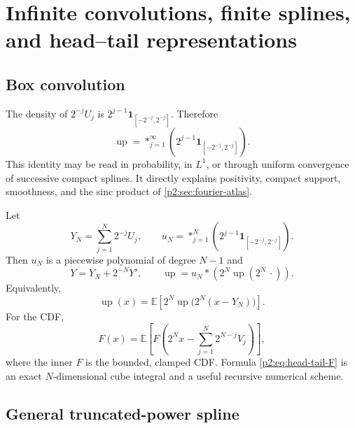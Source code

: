 \documentclass[11pt]{article}
\theoremstyle{definition}
\theoremstyle{remark}
\newcommand{\E}{\mathbb E}
\newcommand{\Up}{\operatorname{up}}
\begin{document}
\section{Infinite convolutions, finite splines, and head--tail representations}
\label{p2:sec:convolution}

\subsection{Box convolution}

The density of $2^{-j}U_j$ is $2^{j-1}\mathbf1_{[-2^{-j},2^{-j}]}$.  Therefore
\begin{equation}
 \boxed{\quad
 \Up=\mathop{\ast}_{j=1}^{\infty}
 \left(2^{j-1}\mathbf1_{[-2^{-j},2^{-j}]}\right).
 \quad}                                                  \label{p2:eq:infinite-box-convolution}
\end{equation}
This identity may be read in probability, in $L^1$, or through uniform convergence of
successive compact splines.  It directly explains positivity, compact support, smoothness,
and the sinc product of \cref{p2:sec:fourier-atlas}.

Let
\begin{equation}
 Y_N=\sum_{j=1}^N2^{-j}U_j,
 \qquad
 u_N=\mathop{\ast}_{j=1}^{N}
 \left(2^{j-1}\mathbf1_{[-2^{-j},2^{-j}]}\right).        \label{p2:eq:finite-box-spline}
\end{equation}
Then $u_N$ is a piecewise polynomial of degree $N-1$ and
\begin{equation}
 Y=Y_N+2^{-N}Y',
 \qquad
 \Up=u_N\ast\left(2^N\Up(2^N\,\cdot)\right).           \label{p2:eq:head-tail-up}
\end{equation}
Equivalently,
\begin{equation}
 \Up(x)=\E\left[2^N\Up\bigl(2^N(x-Y_N)\bigr)\right].   \label{p2:eq:head-tail-up-expectation}
\end{equation}
For the CDF,
\begin{equation}
 F(x)=\E\left[
 F\left(2^Nx-\sum_{j=1}^N2^{N-j}V_j\right)
 \right],                                                \label{p2:eq:head-tail-F}
\end{equation}
where the inner $F$ is the bounded, clamped CDF.  Formula \eqref{p2:eq:head-tail-F} is an exact
$N$-dimensional cube integral and a useful recursive numerical scheme.

\subsection{General truncated-power spline}
\end{document}

